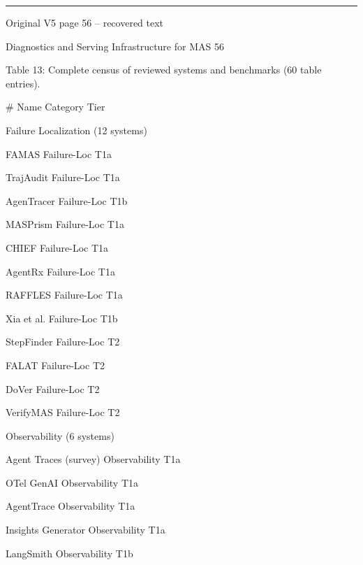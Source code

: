 \par\smallskip\noindent\rule{\textwidth}{0.4pt}\par{\sffamily\footnotesize Original V5 page 56 -- recovered text}\par\begin{flushleft}\footnotesize\ttfamily
\par\smallskip
\par\smallskip
\noindent Diagnostics and Serving Infrastructure for MAS 56\par
\par\smallskip
\par\smallskip
\par\smallskip
\noindent  Table 13: Complete census of reviewed systems and benchmarks (60 table entries).\par
\par\smallskip
\noindent  \# Name Category Tier\par
\noindent  Failure Localization (12 systems)\par
{} FAMAS Failure-Loc T1a\par
{} TrajAudit Failure-Loc T1a\par
{} AgenTracer Failure-Loc T1b\par
{} MASPrism Failure-Loc T1a\par
{} CHIEF Failure-Loc T1a\par
{} AgentRx Failure-Loc T1a\par
{} RAFFLES Failure-Loc T1a\par
{} Xia et al. Failure-Loc T1b\par
{} StepFinder Failure-Loc T2\par
{} FALAT Failure-Loc T2\par
{} DoVer Failure-Loc T2\par
{} VerifyMAS Failure-Loc T2\par
\noindent  Observability (6 systems)\par
{} Agent Traces (survey) Observability T1a\par
{} OTel GenAI Observability T1a\par
{} AgentTrace Observability T1a\par
{} Insights Generator Observability T1a\par
{} LangSmith Observability T1b\par

\end{flushleft}
